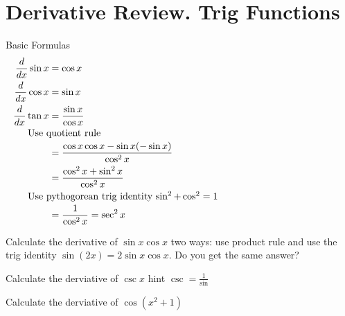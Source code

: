\section*{Derivative Review. Trig Functions}

Basic Formulas
\begin{equation*}
  \begin{aligned}
    \frac{d}{dx} \sin x &= \cos x \\
    \frac{d}{dx} \cos x &= \sin x \\
    \frac{d}{dx} \tan x &= \frac{\sin x}{\cos x} \\
    \noalign{Use quotient rule}
    &= \frac{\cos x \cos x - \sin x (-\sin x)}{\cos^2 x} \\
    &= \frac{\cos^2 x + \sin^2 x}{\cos^2 x} \\
    \noalign{Use pythogorean trig identity $\sin^2 + \cos^2 =1$}
    &= \frac{1}{\cos^2 x}=\sec^2 x\\
  \end{aligned}
\end{equation*}
\begin{questions}
\question
Calculate the derivative of $\sin x \cos x$ two ways: use product rule and use the trig identity $\sin (2x) = 2\sin x\cos x$. Do you get the same answer?
\begin{solution}[1.5in]
\end{solution}
\question
Calculate the derviative of $\csc x$ hint $\csc = \frac{1}{\sin}$
\begin{solution}[1.5in]
\end{solution}
\question
Calculate the derviative of $\cos (x^2+1)$
\begin{solution}[1.5in]
\end{solution}
\end{questions}
